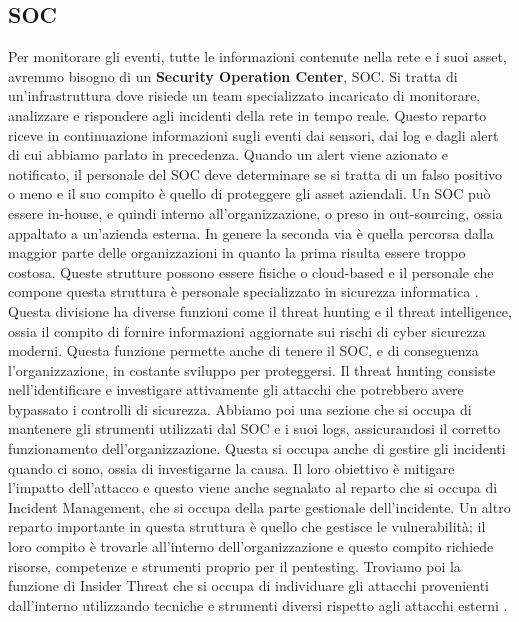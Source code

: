     \subsection{SOC}
        Per monitorare gli eventi, tutte le informazioni contenute nella rete e i suoi asset, avremmo bisogno di un \textbf{Security Operation Center}, SOC. Si tratta di un'infrastruttura dove risiede un team specializzato incaricato di monitorare, analizzare e rispondere agli incidenti della rete in tempo reale. Questo reparto riceve in continuazione informazioni sugli eventi dai sensori, dai log e dagli alert di cui abbiamo parlato in precedenza. Quando un alert viene azionato e notificato, il personale del SOC deve determinare se si tratta di un falso positivo o meno e il suo compito è quello di proteggere gli asset aziendali. Un SOC può essere in-house, e quindi interno all'organizzazione, o preso in out-sourcing, ossia appaltato a un'azienda esterna. In genere la seconda via è quella percorsa dalla maggior parte delle organizzazioni in quanto la prima risulta essere troppo costosa. Queste strutture possono essere fisiche o cloud-based e il personale che compone questa struttura è personale specializzato in sicurezza informatica \cite{soc_functions_book}. 
        Questa divisione ha diverse funzioni come il threat hunting e il threat intelligence, ossia il compito di fornire informazioni aggiornate sui rischi di cyber sicurezza moderni. Questa funzione permette anche di tenere il SOC, e di conseguenza l'organizzazione, in costante sviluppo per proteggersi. Il threat hunting consiste nell'identificare e investigare attivamente gli attacchi che potrebbero avere bypassato i controlli di sicurezza. Abbiamo poi una sezione che si occupa di mantenere gli strumenti utilizzati dal SOC e i suoi logs, assicurandosi il corretto funzionamento dell'organizzazione. Questa si occupa anche di gestire gli incidenti quando ci sono, ossia di investigarne la causa. Il loro obiettivo è mitigare l'impatto dell'attacco e questo viene anche segnalato al reparto che si occupa di Incident Management, che si occupa della parte gestionale dell'incidente. Un altro reparto importante in questa struttura è quello che gestisce le vulnerabilità; il loro compito è trovarle all'interno dell'organizzazione e questo compito richiede risorse, competenze e strumenti proprio per il pentesting. Troviamo poi la funzione di Insider Threat che si occupa di individuare gli attacchi provenienti dall'interno utilizzando tecniche e strumenti diversi rispetto agli attacchi esterni \cite{soc_functions_book}.

